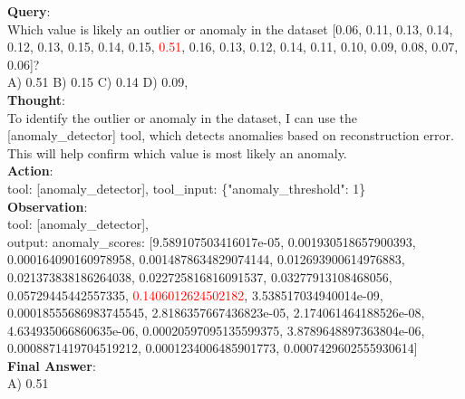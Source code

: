 \begin{tcolorbox}[
  colback=white,
  colframe=black!50,
  boxrule=0.3mm,
  width=\textwidth,
  rounded corners,
  title=Sample 1: Anomaly Detection,
  fonttitle=\bfseries,
  left=2mm, right=2mm, top=2mm, bottom=2mm
]

\textbf{Query}:\\
Which value is likely an outlier or anomaly in the dataset [0.06, 0.11, 0.13, 0.14, 0.12, 0.13, 0.15, 0.14, 0.15, \textcolor{red}{0.51}, 0.16, 0.13, 0.12, 0.14, 0.11, 0.10, 0.09, 0.08, 0.07, 0.06]? \\ A) 0.51 B) 0.15 C) 0.14 D) 0.09, \\

\textbf{Thought}:\\
To identify the outlier or anomaly in the dataset, I can use the [anomaly\_detector] tool, which detects anomalies based on reconstruction error. This will help confirm which value is most likely an anomaly.\\

\textbf{Action}:\\
tool: [anomaly\_detector], tool\_input: \{"anomaly\_threshold": 1\}\\

\textbf{Observation}: \\
tool: [anomaly\_detector], 
\\
output: anomaly\_scores: [9.589107503416017e-05, 0.001930518657900393, 0.000164090160978958, 0.0014878634829074144, 0.012693900614976883, 0.021373838186264038, 0.022725816816091537, 0.03277913108468056, 0.05729445442557335, \textcolor{red}{0.1406012624502182}, 3.538517034940014e-09, 0.00018555686983745545, 2.8186357667436823e-05, 2.174061464188526e-08, 4.634935066860635e-06, 0.00020597095135599375, 3.8789648897363804e-06, 0.0008871419704519212, 0.0001234006485901773, 0.0007429602555930614] \\

\textbf{Final Answer}: \\
A) 0.51
\end{tcolorbox}


